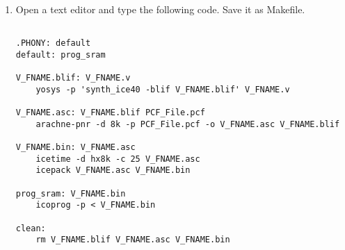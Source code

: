 \documentclass[journal,12pt,twocolumn]{IEEEtran}
\begin{document}
\begin{enumerate}




\item Open a text editor and type the following code. Save it as Makefile.
\begin{lstlisting}

.PHONY: default
default: prog_sram

V_FNAME.blif: V_FNAME.v
	yosys -p 'synth_ice40 -blif V_FNAME.blif' V_FNAME.v

V_FNAME.asc: V_FNAME.blif PCF_File.pcf
	arachne-pnr -d 8k -p PCF_File.pcf -o V_FNAME.asc V_FNAME.blif

V_FNAME.bin: V_FNAME.asc
	icetime -d hx8k -c 25 V_FNAME.asc
	icepack V_FNAME.asc V_FNAME.bin

prog_sram: V_FNAME.bin
	icoprog -p < V_FNAME.bin

clean:
	rm V_FNAME.blif V_FNAME.asc V_FNAME.bin

\end{lstlisting}






\end{enumerate}

\end{document}
